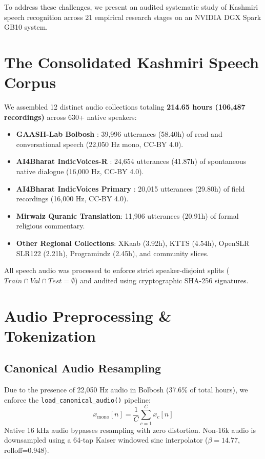\documentclass[11pt,a4paper]{article}
\begin{document}
To address these challenges, we present an audited systematic study of Kashmiri speech recognition across 21 empirical research stages on an NVIDIA DGX Spark GB10 system.

\section{The Consolidated Kashmiri Speech Corpus}
We assembled 12 distinct audio collections totaling \textbf{214.65 hours (106,487 recordings)} across 630+ native speakers:
\begin{itemize}
    \item \textbf{GAASH-Lab Bolbosh} \cite{malik2024koshurocr}: 39,996 utterances (58.40h) of read and conversational speech (22,050 Hz mono, CC-BY 4.0).
    \item \textbf{AI4Bharat IndicVoices-R} \cite{sankar2024indicvoicesr}: 24,654 utterances (41.87h) of spontaneous native dialogue (16,000 Hz, CC-BY 4.0).
    \item \textbf{AI4Bharat IndicVoices Primary} \cite{javed2024indicvoices}: 20,015 utterances (29.80h) of field recordings (16,000 Hz, CC-BY 4.0).
    \item \textbf{Mirwaiz Quranic Translation}: 11,906 utterances (20.91h) of formal religious commentary.
    \item \textbf{Other Regional Collections}: XKaab (3.92h), KTTS (4.54h), OpenSLR SLR122 (2.21h), Programindz (2.45h), and community slices.
\end{itemize}

All speech audio was processed to enforce strict speaker-disjoint splits ($Train \cap Val \cap Test = \emptyset$) and audited using cryptographic SHA-256 signatures.

\section{Audio Preprocessing \& Tokenization}
\subsection{Canonical Audio Resampling}
Due to the presence of 22,050 Hz audio in Bolbosh (37.6\% of total hours), we enforce the \texttt{load\_canonical\_audio()} pipeline:
\begin{equation}
    x_{\text{mono}}[n] = \frac{1}{C}\sum_{c=1}^C x_c[n]
\end{equation}
Native 16 kHz audio bypasses resampling with zero distortion. Non-16k audio is downsampled using a 64-tap Kaiser windowed sinc interpolator ($\beta=14.77$, rolloff=0.948).
\end{document}

